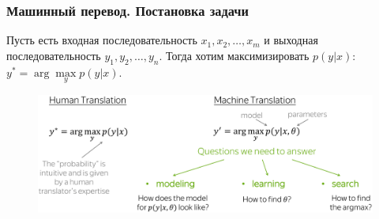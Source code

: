 \documentclass[notheorems, handout]{beamer}
\begin{document}
	\begin{frame}
	\frametitle{Машинный перевод. Постановка задачи}
		Пусть есть входная последовательность $x_1, x_2, \dots, x_m$ и выходная последовательность $y_1, y_2, \dots, y_n$. Тогда хотим максимизировать $p(y|x)$: $y^{\ast}=\arg\max\limits_{y}p(y|x).$
		\vspace{0.3cm}
		\begin{figure}[H]
			\begin{center}
				\includegraphics[scale=0.1]{img/translation.png}
			\end{center}
		\end{figure}
	\end{frame}
	
\end{document}
